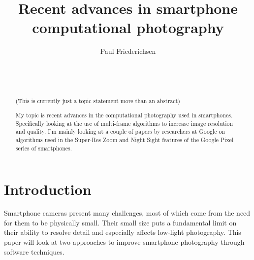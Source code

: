 \documentclass{sig-alternate}
\begin{document}

\title{Recent advances in smartphone computational photography}


\author{
\alignauthor
Paul Friederichsen\\
	\\
	\\
	\\
}

\maketitle

\begin{abstract}
(This is currently just a topic statement more than an abstract)

My topic is recent advances in the computational photography used in smartphones. Specifically looking at the use of multi-frame algorithms to increase image resolution and quality. I'm mainly looking at a couple of papers by researchers at Google on algorithms used in the Super-Res Zoom and Night Sight features of the Google Pixel series of smartphones.
\end{abstract}


\section{Introduction}

Smartphone cameras present many challenges, most of which come from the need for them to be physically small. Their small size puts a fundamental limit on their ability to resolve detail and especially affects low-light photography. This paper will look at two approaches to improve smartphone photography through software techniques.

\end{document}
